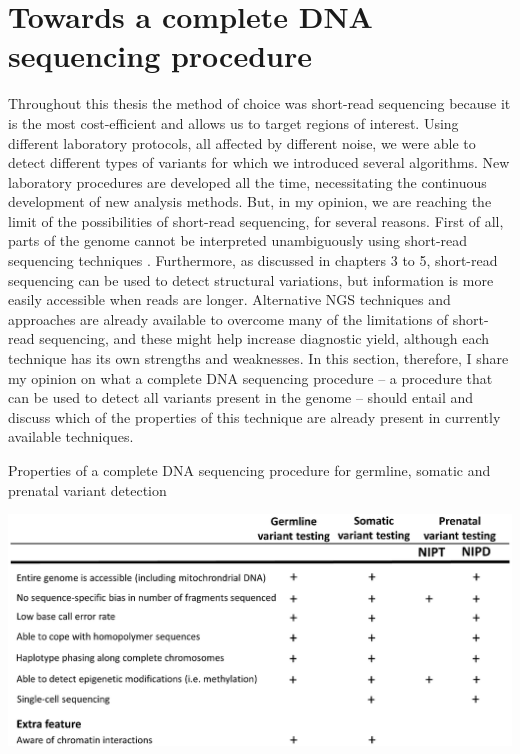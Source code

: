 \section{Towards a complete DNA sequencing procedure}\label{complete}
Throughout this thesis the method of choice was short-read sequencing because it is the most cost-efficient and allows us to target regions of interest. 
Using different laboratory protocols, all affected by different noise, we were able to detect different types of variants for which we introduced several algorithms. 
New laboratory procedures are developed all the time, necessitating the continuous development of new analysis methods. 
But, in my opinion, we are reaching the limit of the possibilities of short-read sequencing, for several reasons. 
First of all, parts of the genome cannot be interpreted unambiguously using short-read sequencing techniques \cite{Mandelker_2016}.
Furthermore, as discussed in chapters 3 to 5, short-read sequencing can be used to detect structural variations, but information is more easily accessible when reads are longer. 
Alternative NGS techniques and approaches are already available to overcome many of the limitations of short-read sequencing, and these might help increase diagnostic yield, although each technique has its own
strengths and weaknesses. 
In this section, therefore, I share my opinion on what a complete DNA sequencing procedure – a procedure that can be used to detect all variants present in the genome – should entail and discuss which of the properties of this technique are already present in currently available techniques. 

\begin{table}
	\caption[Properties of a complete DNA sequencing procedure]{Properties of a complete DNA sequencing procedure for germline, somatic and prenatal variant detection}
	\includegraphics[width=1.0\linewidth]{img/Chapter11_table1}
	\label{table:Chapter11_table1}
\end{table}

